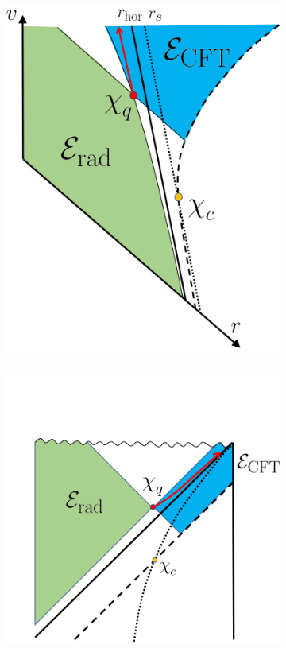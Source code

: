\documentclass[12pt]{article}
\begin{document}
\begin{figure}[t]
\begin{subfigure}{.48\textwidth}
  \centering
 \includegraphics[width = 0.58\linewidth]{BH_Eddington.png}
\end{subfigure}
\begin{subfigure}{.48\textwidth}
  \centering
  \vspace{-2cm}
 \includegraphics[width = 0.9\linewidth]{BH_Penrose.png}
\end{subfigure}
\centering

\end{figure}
\end{document}
